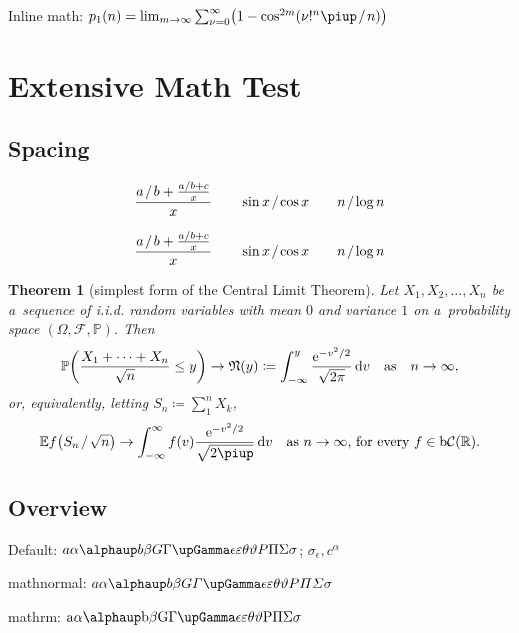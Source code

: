 \documentclass[12pt, a4paper, oneside]{article}
\newcommand{\mathup}[1]{\mathrm{#1}}
\newcommand*{\divslash}{%
	\mathbin{%
		\nonscript\mskip-2mu / \nonscript\mskip-2mu%
	}%
}  %
\theoremstyle{Plain}
\newtheorem{theorem}{Theorem}
\theoremstyle{Definition}
\theoremstyle{Remark}
\begin{document}
\begin{appendix}
\medskip
Inline math:
$p_1(n)=\lim_{m\to\infty}\sum_{\nu=0}^\infty\bigl(1-\cos^{2m}(\nu!^n\piup \divslash n)\bigr)$

\endgroup

\clearpage

\section{Extensive Math Test \showfamily}

\subsection{Spacing}

$$\frac{a \divslash b + \frac{a \divslash b + c}{x}}{x} \qquad \sin x \divslash \cos x \qquad n \divslash \log n$$

{\boldmath $$\frac{a \divslash b + \frac{a \divslash b + c}{x}}{x} \qquad \sin x \divslash \cos x \qquad n \divslash \log n$$}

\begin{theorem}[simplest form of the Central Limit Theorem]
	\label{theorem:SFCLT}
	Let $X_1, X_2, \ldots, X_n$ be a~sequence of i.i.d. random variables with mean $0$
	and variance $1$ on a~probability space $(\Omega, \mathcal{F}, \mathbb{P})$. Then
	\[
		\mathbb{P}{\left(\frac{X_1+\cdots+X_n}{\sqrt{n}}\le y\right)} \to
		\mathfrak{N}(y) \coloneq
		\int_{-\infty}^y \frac{\mathup{e}^{-v^2 \divslash 2}}{\sqrt{2\mathup{\pi}}}\,\mathup{d}v
		\quad\text{as} \quad n\to\infty,
	\]
	or, equivalently, letting $S_n \coloneq \sum_1^n X_k$,
	\[
		\mathbb{E} f \big( S_n \divslash \sqrt{n} \big) \to
		\int_{-\infty}^\infty f(v) \frac{\mathup{e}^{-v^2 \divslash 2}}{\sqrt{2\piup}}\,\mathup{d}v
		\quad \mbox{as $n\to\infty$, for every $f \in \mathup{b}\mathcal{C}(\mathbb{R})$.}
	\]
\end{theorem}

\subsection{Overview \showfamily}

{\parindent 0pt
Default: $a \alpha \alphaup b \beta G \Gamma \upGamma \epsilon \varepsilon \theta \vartheta P \Pi \Sigma \sigma$; $\sigma_\epsilon, c^\alpha$

mathnormal: $\mathnormal{a \alpha \alphaup b \beta G \Gamma \upGamma \epsilon \varepsilon \theta \vartheta P \Pi \Sigma \sigma}$

mathrm: $\mathrm{a \alpha \alphaup b \beta G \Gamma \upGamma \epsilon \varepsilon \theta \vartheta P \Pi \Sigma \sigma}$

}
\end{appendix}
\end{document}
